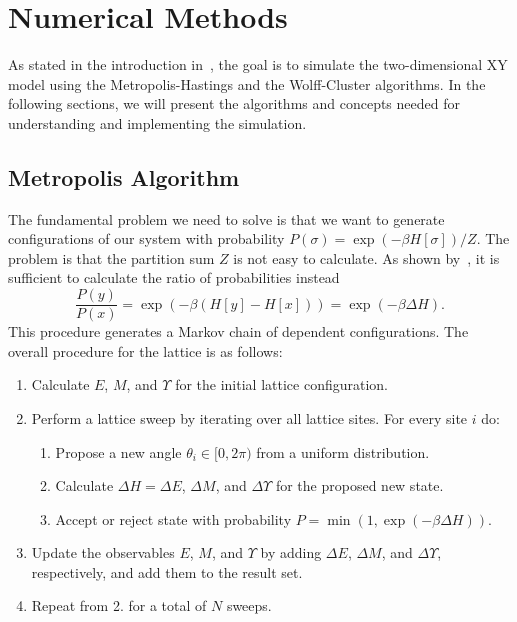 \section{Numerical Methods}\label{sec:theo:numerical_methods}
	As stated in the introduction in~, the goal is to simulate the two-dimensional XY model using the Metropolis-Hastings and the Wolff-Cluster algorithms. In the following sections, we will present the algorithms and concepts needed for understanding and implementing the simulation.

	\subsection{Metropolis Algorithm}\label{sec:theo:metropolis}
		The fundamental problem we need to solve is that we want to generate configurations of our system with probability $P(\sigma) = \exp{(-\beta H[\sigma])}/Z$. The problem is that the partition sum $Z$ is not easy to calculate. As shown by~\citet{metropolis}, it is sufficient to calculate the ratio of probabilities instead
		\begin{equation}
			\frac{P(y)}{P(x)} = \exp{(-\beta(H[y] - H[x]))} = \exp{(-\beta \Delta H)}.
		\end{equation}
		This procedure generates a Markov chain of dependent configurations. The overall procedure for the lattice is as follows:
		\begin{enumerate}
			\item Calculate $E$, $M$, and $\Upsilon$ for the initial lattice configuration.
			\item Perform a lattice sweep by iterating over all lattice sites. For every site $i$ do:
			\begin{enumerate}
				\item Propose a new angle $\theta_i \in [0,2\pi)$ from a uniform distribution.
				\item Calculate $\Delta H = \Delta E$, $\Delta M$, and $\Delta \Upsilon$ for the proposed new state.
				\item Accept or reject state with probability $P = \min{(1, \exp{(-\beta\Delta H)})}$.
			\end{enumerate}
			\item Update the observables $E$, $M$, and $\Upsilon$ by adding $\Delta E$, $\Delta M$, and $\Delta \Upsilon$, respectively, and add them to the result set.
			\item Repeat from 2. for a total of $N$ sweeps.
		\end{enumerate}
		
